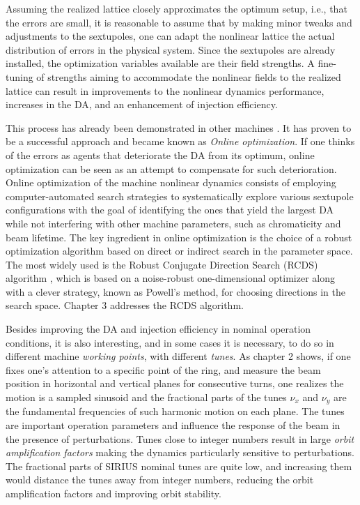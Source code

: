 Assuming the realized lattice closely approximates the optimum setup, i.e., that the errors are small, it is reasonable to assume that by making minor tweaks and adjustments to the sextupoles, one can adapt the nonlinear lattice the actual distribution of errors in the physical system. Since the sextupoles are already installed, the optimization variables available are their field strengths. A fine-tuning of strengths aiming to accommodate the nonlinear fields to the realized lattice can result in improvements to the nonlinear dynamics performance, increases in the DA, and an enhancement of injection efficiency.

This process has already been demonstrated in other machines \cite{huang_algorithm_2013, huang_online_2015,liuzzo_rcds_2016,olsson_online_2018, yang_online_2022}. It has proven to be a successful approach and became known as \textit{Online optimization}. If one thinks of the errors as agents that deteriorate the DA from its optimum, online optimization can be seen as an attempt to compensate for such deterioration. Online optimization of the machine nonlinear dynamics consists of employing computer-automated search strategies to systematically explore various sextupole configurations with the goal of identifying the ones that yield the largest DA while not interfering with other machine parameters, such as chromaticity and beam lifetime. The key ingredient in online optimization is the choice of a robust optimization algorithm based on direct or indirect search in the parameter space. The most widely used is the Robust Conjugate Direction Search (RCDS) algorithm \cite{huang_algorithm_2013}, which is based on a noise-robust one-dimensional optimizer along with a clever strategy, known as Powell's method, for choosing directions in the search space. Chapter 3 addresses the RCDS algorithm.

Besides improving the DA and injection efficiency in nominal operation conditions, it is also interesting, and in some cases it is necessary, to do so in different machine \textit{working points}, with different \textit{tunes}. As chapter 2 shows, if one fixes one's attention to a specific point of the ring, and measure the beam position in horizontal and vertical planes for consecutive turns, one realizes the motion is a sampled sinusoid and the fractional parts of the tunes $\nu_x$ and $\nu_y$ are the fundamental frequencies of such harmonic motion on each plane. The tunes are important operation parameters and influence the response of the beam in the presence of perturbations. Tunes close to integer numbers result in large \textit{orbit amplification factors} making the dynamics particularly sensitive to perturbations. The fractional parts of SIRIUS nominal tunes are quite low, and increasing them would distance the tunes away from integer numbers, reducing the orbit amplification factors and improving orbit stability.

